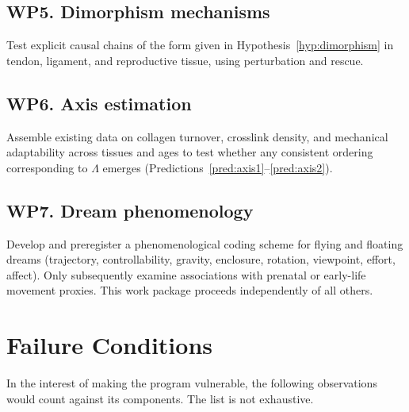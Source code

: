 \documentclass[11pt,a4paper]{article}
\theoremstyle{plain}
\theoremstyle{definition}
\theoremstyle{remark}
\begin{document}
\subsection{WP5. Dimorphism mechanisms}

Test explicit causal chains of the form given in Hypothesis~\ref{hyp:dimorphism} in tendon, ligament, and reproductive tissue, using perturbation and rescue.

\subsection{WP6. Axis estimation}

Assemble existing data on collagen turnover, crosslink density, and mechanical adaptability across tissues and ages to test whether any consistent ordering corresponding to $\Lambda$ emerges (Predictions~\ref{pred:axis1}--\ref{pred:axis2}).

\subsection{WP7. Dream phenomenology}

Develop and preregister a phenomenological coding scheme for flying and floating dreams (trajectory, controllability, gravity, enclosure, rotation, viewpoint, effort, affect). Only subsequently examine associations with prenatal or early-life movement proxies. This work package proceeds independently of all others.

\section{Failure Conditions}\label{sec:failure}

In the interest of making the program vulnerable, the following observations would count against its components. The list is not exhaustive.
\end{document}
